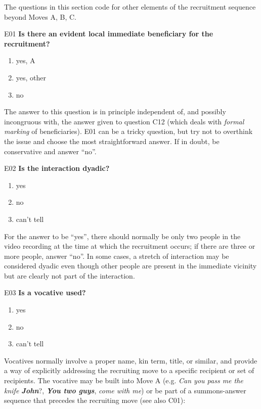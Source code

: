 \documentclass[output=paper]{langsci/langscibook}
\begin{document}
\noindent The questions in this section code for other elements of the recruitment sequence beyond Moves A, B, C.
\begin{description}
\item E01  \textbf{Is there an evident local immediate beneficiary for the recruitment?}

\begin{enumerate}
\item {yes, A}
\item {yes, other}
\item {no}
\end{enumerate}

The answer to this question is in principle independent of, and possibly incongruous with, the answer given to question C12 (which deals with \textit{formal marking} of beneficiaries). E01 can be a tricky question, but try not to overthink the issue and choose the most straightforward answer. If in doubt, be conservative and answer “no”.

\item
E02  \textbf{Is the interaction dyadic?}

\begin{enumerate}
\item{yes}
\item {no}
\item {can't tell}
\end{enumerate}

For the answer to be “yes”,  there should normally be only two people in the video recording at the time at which the recruitment occurs; if there are three or more people, answer “no”. In some cases, a stretch of interaction may be considered dyadic even though other people are present in the immediate vicinity but are clearly not part of the interaction.

\item E03  \textbf{Is a vocative used?}

\begin{enumerate}
\item{yes}
\item {no}
\item {can't tell}
\end{enumerate}

Vocatives normally involve a proper name, kin term, title, or similar, and provide a way of explicitly addressing the recruiting move to a specific recipient or set of recipients. The vocative may be built into Move A (e.g. \textit{Can you pass me the knife \textbf{John}}?, \textit{\textbf{You two guys}}, \textit{come with me}) or be part of a summons-answer sequence that precedes the recruiting move (see also C01):


\end{description}
\end{document}

